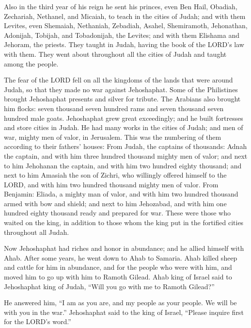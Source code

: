 \myverse{}Also in the third year of his reign he sent his princes, even
Ben Hail, Obadiah, Zechariah, Nethanel, and Micaiah, to teach in the cities of Judah;
\myverse{}and with them Levites, even Shemaiah, Nethaniah, Zebadiah, Asahel, Shemiramoth,
Jehonathan, Adonijah, Tobijah, and Tobadonijah, the Levites; and with them Elishama and Jehoram, the priests.
\myverse{}They taught in Judah, having the book of the LORD’s law with them. They went
about throughout all the cities of Judah and taught among the people.

\myverse{}The fear of the LORD fell on all the kingdoms of the lands that
were around Judah, so that they made no war against Jehoshaphat.
\myverse{}Some of the Philistines brought Jehoshaphat presents and silver for tribute.
The Arabians also brought him flocks: seven thousand seven hundred rams and seven thousand seven hundred
male goats.
\myverse{}Jehoshaphat grew great exceedingly; and he built fortresses and store cities
in Judah.
\myverse{}He had many works in the cities of Judah; and men of war, mighty men of valor,
in Jerusalem.
\myverse{}This was the numbering of them according to their fathers’ houses: From Judah,
the captains of thousands: Adnah the captain, and with him three hundred thousand mighty men of valor;
\myverse{}and next to him Jehohanan the captain, and with him two hundred eighty thousand;
\myverse{}and next to him Amasiah the son of Zichri, who willingly offered himself
to the LORD, and with him two hundred thousand mighty men of valor.
\myverse{}From Benjamin: Eliada, a mighty man of valor, and with him two hundred thousand
armed with bow and shield;
\myverse{}and next to him Jehozabad, and with him one hundred eighty thousand ready
and prepared for war.
\myverse{}These were those who waited on the king, in addition to those whom the king
put in the fortified cities throughout all Judah.


\mychapter{} \myverse*{}Now Jehoshaphat had riches and honor in abundance; and he allied
himself with Ahab.
\myverse{}After some years, he went down to Ahab to Samaria. Ahab killed sheep and cattle
for him in abundance, and for the people who were with him, and moved him to go up with him to Ramoth
Gilead.
\myverse{}Ahab king of Israel said to Jehoshaphat king of Judah, “Will you go with me
to Ramoth Gilead?”

He answered him, “I am as you are, and my people as your people. We will be with you in the
war.”
\myverse{}Jehoshaphat said to the king of Israel, “Please inquire first for the LORD’s
word.”

